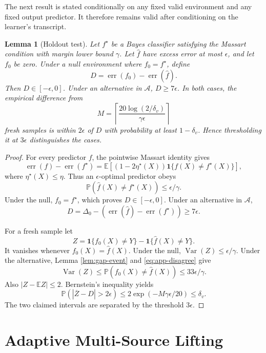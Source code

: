 \documentclass[twoside]{article}
\newtheorem{lemma}[theorem]{Lemma}
\newcommand{\E}{\mathbb E}
\newcommand{\PP}{\mathbb P}
\newcommand{\err}{\operatorname{err}}
\newcommand{\1}{\mathbf 1}
\begin{document}
The next result is stated conditionally on any fixed valid environment and
any fixed output predictor. It therefore remains valid after conditioning on
the learner's transcript.

\begin{lemma}[Holdout test]
\label{lem:holdout}
Let $f^\star$ be a Bayes classifier satisfying the Massart condition with
margin lower bound $\gamma$. Let $\widehat f$ have excess error at most
$\epsilon$, and let $f_0$ be zero. Under a null environment where
$f_0=f^\star$, define
\[
 D=\err(f_0)-\err(\widehat f).
\]
Then $D\in[-\epsilon,0]$. Under an alternative in $\mathcal A$,
$D\ge7\epsilon$. In both cases, the empirical difference from
\begin{equation}
 M=\left\lceil
 \frac{20\log(2/\delta_v)}{\gamma\epsilon}
 \right\rceil
 \label{eq:app-M}
\end{equation}
fresh samples is within $2\epsilon$ of $D$ with probability at least
$1-\delta_v$. Hence thresholding it at $3\epsilon$ distinguishes the cases.
\end{lemma}

\begin{proof}
For every predictor $f$, the pointwise Massart identity gives
\[
 \err(f)-\err(f^\star)
 =\E[(1-2\eta^\star(X))\1\{f(X)\ne f^\star(X)\}],
\]
where $\eta^\star(X)\le\eta$. Thus an $\epsilon$-optimal predictor obeys
\begin{equation}
 \PP(\widehat f(X)\ne f^\star(X))\le\epsilon/\gamma.
 \label{eq:app-disagree}
\end{equation}
Under the null, $f_0=f^\star$, which proves $D\in[-\epsilon,0]$. Under an
alternative in $\mathcal A$,
\[
 D=\Delta_0-(\err(\widehat f)-\err(f^\star))\ge7\epsilon.
\]

For a fresh sample let
\[
 Z=\1\{f_0(X)\ne Y\}-\1\{\widehat f(X)\ne Y\}.
\]
It vanishes whenever $f_0(X)=\widehat f(X)$. Under the null,
$\operatorname{Var}(Z)\le\epsilon/\gamma$. Under the alternative, Lemma
\ref{lem:gap-event} and \eqref{eq:app-disagree} give
\[
 \operatorname{Var}(Z)
 \le\PP(f_0(X)\ne\widehat f(X))
 \le33\epsilon/\gamma.
\]
Also $|Z-\E Z|\le2$. Bernstein's inequality yields
\[
 \PP(|\overline Z-D|>2\epsilon)
 \le2\exp(-M\gamma\epsilon/20)\le\delta_v.
\]
The two claimed intervals are separated by the threshold $3\epsilon$.
\end{proof}

\section{Adaptive Multi-Source Lifting}
\label{app:lifting}
\end{document}
